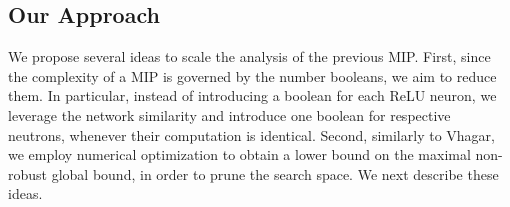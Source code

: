 \begin{comment}
\begin{itemize}
    \item if $\forall{i} (w_{m,k,k_i}\cdot{z^F_{m-1,k_i}}=w_{m,k',k_i}\cdot{z^{\hat{F}}_{m-1,k'_i}})$ then $z^F_{m,k}=z^{\hat{F}}_{m',k'}$ and $a^F_{m,k}=a^{\hat{F}}_{m',k'}$
    \item if $\forall{i} (w_{m,k,k_i}\cdot{z^F_{m-1,k_i}}\ge{w_{m,k',k_i}\cdot{z^{\hat{F}}_{m-1,k'_i}}})$ then $z^F_{m,k}\ge{z^{\hat{F}}_{m',k'}}$ and $a^F_{m,k}\ge{a^{\hat{F}}_{m',k'}}$
    \item if $\forall{i} (w_{m,k,k_i}\cdot{z^F_{m-1,k_i}}\le{w_{m,k',k_i}\cdot{z^{\hat{F}}_{m-1,k'_i}}})$ then $z^F_{m,k}\le{z^{\hat{F}}_{m',k'}}$ and $a^F_{m,k}\le{a^{\hat{F}}_{m',k'}}$
\end{itemize}


\end{comment}

\subsection{Our Approach}
We propose several ideas to scale the analysis of the previous MIP. 
First, since the complexity of a MIP is governed
 by the number booleans, we aim to reduce them. In particular, instead of introducing a boolean for each ReLU neuron, we leverage the network similarity and introduce one boolean for respective neutrons, whenever their computation is identical.
Second, similarly to Vhagar, we employ numerical optimization to obtain a lower bound on the maximal non-robust global bound, in order to prune the search space. %
 We next describe these ideas.

